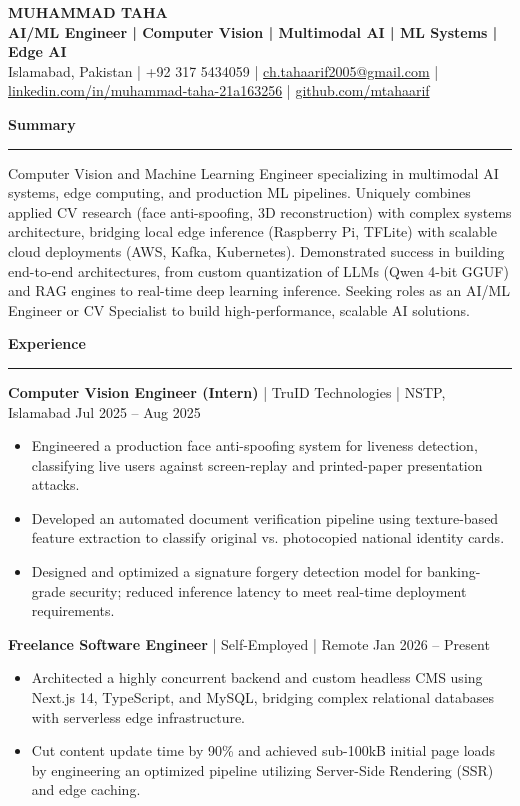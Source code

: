 \documentclass[10pt,a4paper]{article}
\newcommand{\sectiontitle}[1]{
  \vspace{5pt}\textbf{\large #1}\vspace{3pt}\\
  \hrule\vspace{5pt}
}
\begin{document}
{\LARGE \textbf{MUHAMMAD TAHA}}\\
\textbf{AI/ML Engineer | Computer Vision | Multimodal AI | ML Systems | Edge AI}\\
Islamabad, Pakistan | +92 317 5434059 | \href{mailto:ch.tahaarif2005@gmail.com}{ch.tahaarif2005@gmail.com} | \\
\href{https://linkedin.com/in/muhammad-taha-21a163256}{linkedin.com/in/muhammad-taha-21a163256} | \href{https://github.com/mtahaarif}{github.com/mtahaarif}

\sectiontitle{Summary}
Computer Vision and Machine Learning Engineer specializing in multimodal AI systems, edge computing, and production ML pipelines. Uniquely combines applied CV research (face anti-spoofing, 3D reconstruction) with complex systems architecture, bridging local edge inference (Raspberry Pi, TFLite) with scalable cloud deployments (AWS, Kafka, Kubernetes). Demonstrated success in building end-to-end architectures, from custom quantization of LLMs (Qwen 4-bit GGUF) and RAG engines to real-time deep learning inference. Seeking roles as an AI/ML Engineer or CV Specialist to build high-performance, scalable AI solutions.

\sectiontitle{Experience}
\textbf{Computer Vision Engineer (Intern)} | TruID Technologies | NSTP, Islamabad \hfill Jul 2025 -- Aug 2025
\begin{itemize}
  \item Engineered a production face anti-spoofing system for liveness detection, classifying live users against screen-replay and printed-paper presentation attacks.
  \item Developed an automated document verification pipeline using texture-based feature extraction to classify original vs. photocopied national identity cards.
  \item Designed and optimized a signature forgery detection model for banking-grade security; reduced inference latency to meet real-time deployment requirements.
\end{itemize}

\textbf{Freelance Software Engineer} | Self-Employed | Remote \hfill Jan 2026 -- Present
\begin{itemize}
  \item Architected a highly concurrent backend and custom headless CMS using Next.js 14, TypeScript, and MySQL, bridging complex relational databases with serverless edge infrastructure.
  \item Cut content update time by 90\% and achieved sub-100kB initial page loads by engineering an optimized pipeline utilizing Server-Side Rendering (SSR) and edge caching.
\end{itemize}
\end{document}
